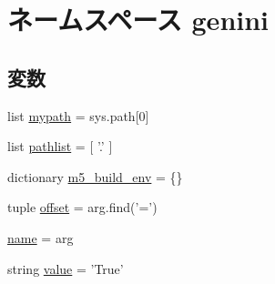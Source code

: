 \hypertarget{namespacegenini}{
\section{ネームスペース genini}
\label{namespacegenini}
}
\subsection*{変数}
\begin{DoxyCompactItemize}
\item 
list \hyperlink{namespacegenini_af003d3efd88ef6dd85ffdf56beccdcd2}{mypath} = sys.path\mbox{[}0\mbox{]}
\item 
list \hyperlink{namespacegenini_a5c9252f42a495ae8bb6c1a8dd3e08ecb}{pathlist} = \mbox{[} '.' \mbox{]}
\item 
dictionary \hyperlink{namespacegenini_a94909331988af62d194b4c4a2bf41835}{m5\_\-build\_\-env} = \{\}
\item 
tuple \hyperlink{namespacegenini_a03fbaceb13719d1bc975d26c3b92761a}{offset} = arg.find('=')
\item 
\hyperlink{namespacegenini_a246c983618eb29ab8c7afd521134f631}{name} = arg
\item 
string \hyperlink{namespacegenini_a7e5f482a3a8a4f98bd1a9c124485f572}{value} = 'True'
\end{DoxyCompactItemize}


